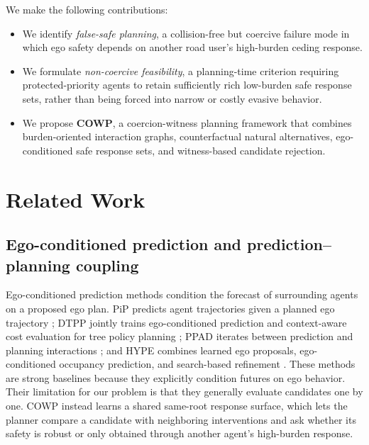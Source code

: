 \documentclass[10pt]{article}
\newcommand{\framework}{COWP}
\begin{document}
We make the following contributions: \begin{itemize} 
\item We identify \emph{false-safe planning}, a collision-free but coercive failure mode in which ego safety depends on another road user's high-burden ceding response. 
\item We formulate \emph{non-coercive feasibility}, a planning-time criterion requiring protected-priority agents to retain sufficiently rich low-burden safe response sets, rather than being forced into narrow or costly evasive behavior. 
\item We propose \textbf{COWP}, a coercion-witness planning framework that combines burden-oriented interaction graphs, counterfactual natural alternatives, ego-conditioned safe response sets, and witness-based candidate rejection. \end{itemize}


\section{Related Work}

\subsection{Ego-conditioned prediction and prediction--planning coupling}
Ego-conditioned prediction methods condition the forecast of surrounding agents on a proposed ego plan. PiP predicts agent trajectories given a planned ego trajectory \parencite{song2020pip}; DTPP jointly trains ego-conditioned prediction and context-aware cost evaluation for tree policy planning \parencite{huang2024dtpp}; PPAD iterates between prediction and planning interactions \parencite{chen2024ppad}; and HYPE combines learned ego proposals, ego-conditioned occupancy prediction, and search-based refinement \parencite{yu2025hype}. These methods are strong baselines because they explicitly condition futures on ego behavior. Their limitation for our problem is that they generally evaluate candidates one by one. \framework{} instead learns a shared same-root response surface, which lets the planner compare a candidate with neighboring interventions and ask whether its safety is robust or only obtained through another agent's high-burden response.
\end{document}
